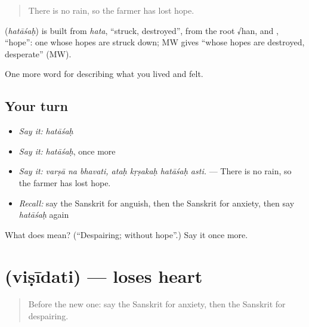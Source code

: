 \begin{quote}
There is no rain, so the farmer has lost hope.
\end{quote}

\begin{cousinweb}
\textbf{} (\emph{hatāśaḥ}) is built from \emph{hata}, \textquotedblleft{}struck, destroyed\textquotedblright{}, from the root √han, and \textbf{}, \textquotedblleft{}hope\textquotedblright{}: one whose hopes are struck down; MW gives \textquotedblleft{}whose hopes are destroyed, desperate\textquotedblright{} (MW).
\end{cousinweb}

\begin{grammarlens}[title={What you've built}]
One more word for describing what you lived and felt.
\end{grammarlens}

\subsection*{Your turn}
\begin{itemize}
\raggedright
  \item \emph{Say it:} \emph{hatāśaḥ}
  \item \emph{Say it:} \emph{hatāśaḥ}, once more
  \item \emph{Say it:} \emph{varṣā na bhavati, ataḥ kṛṣakaḥ hatāśaḥ asti.} — There is no rain, so the farmer has lost hope.
  \item \emph{Recall:} say the Sanskrit for anguish, then the Sanskrit for anxiety, then say \emph{hatāśaḥ} again
\end{itemize}

\begin{tcolorbox}[breakable,colback=teal!4,colframe=teal!35!black,title={Before you move on}]
What does  mean? (\textquotedblleft{}Despairing; without hope\textquotedblright{}.) Say it once more.
\end{tcolorbox}
\section[\texorpdfstring{\sk{विषीदति} (viṣīdati)}{विषीदति (viṣīdati)}]{ (viṣīdati) — loses heart}

\label{lesson:SA-C452-visidati}



\begin{quote}
Before the new one: say the Sanskrit for anxiety, then the Sanskrit for despairing.
\end{quote}

